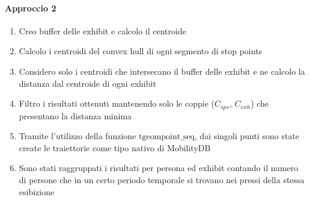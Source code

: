 \documentclass[12pt]{article}
\begin{document}
\paragraph{Approccio 2}
\begin{enumerate}
    \item Creo buffer delle exhibit e calcolo il centroide
    \item Calcolo i centroidi del convex hull di ogni segmento di stop points
    \item Considero solo i centroidi che intersecano il buffer delle exhibit e ne calcolo la distanza dal centroide di ogni exhibit
    \item Filtro i risultati ottenuti mantenendo solo le coppie ($C_{sps}$, $C_{exh}$) che presentano la distanza minima
    \item Tramite l'utilizzo della funzione $\text{tgeompoint\_seq}$, dai singoli punti sono state create le traiettorie come tipo nativo di MobilityDB
    \item Sono stati raggruppati i risultati per persona ed exhibit contando il numero di persone che in un certo periodo temporale si trovano nei pressi della stessa esibizione
\end{enumerate}
\end{document}
